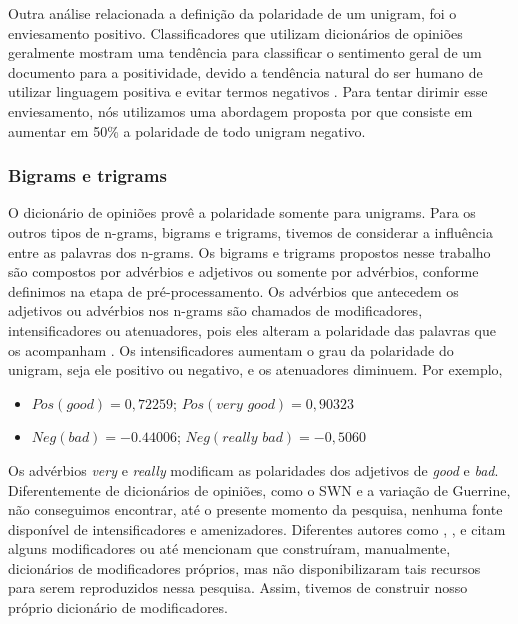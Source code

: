 Outra análise relacionada a definição da polaridade de um unigram, foi o enviesamento positivo. Classificadores que utilizam dicionários de opiniões geralmente mostram uma tendência para classificar o sentimento geral de um documento para a positividade, devido a tendência natural do ser humano de utilizar linguagem positiva e evitar termos negativos \cite{boucher1969pollyanna, kennedy2006sentiment}. Para tentar dirimir esse enviesamento, nós utilizamos uma abordagem proposta por \cite{taboada2011lexicon} que consiste em aumentar em 50\% a polaridade de todo unigram negativo. 

\subsubsection{Bigrams e trigrams}

O dicionário de opiniões provê a polaridade somente para unigrams. Para os outros tipos de n-grams, bigrams e trigrams, tivemos de considerar a influência entre as palavras dos n-grams. Os bigrams e trigrams propostos nesse trabalho são compostos por advérbios e adjetivos ou somente por advérbios, conforme definimos na etapa de pré-processamento. Os advérbios que antecedem os adjetivos ou advérbios nos n-grams são chamados de modificadores, intensificadores ou atenuadores, pois eles alteram a polaridade das palavras que os acompanham \cite{voll2007not}. Os intensificadores aumentam o grau da polaridade do unigram, seja ele positivo ou negativo, e os atenuadores diminuem. Por exemplo, 

\begin{itemize}
\item \label{itm:very_exem} $Pos(\textit{good}) = 0,72259$; $Pos(\textit{very good}) = 0,90323$
\item \label{itm:really_exem} $Neg(\textit{bad}) = -0.44006$; $Neg(\textit{really bad}) = -0,5060$
\end{itemize}

Os advérbios \textit{very} e \textit{really} modificam as polaridades dos adjetivos de \textit{good} e \textit{bad}. Diferentemente de dicionários de opiniões, como o SWN e a variação de Guerrine, não conseguimos encontrar, até o presente momento da pesquisa, nenhuma fonte disponível de intensificadores e amenizadores. Diferentes autores como \cite{voll2007not}, \cite{taboada2008extracting}, \cite{taboada2011lexicon} e \cite{pimpalkar2013sentimental} citam alguns modificadores ou até mencionam que construíram, manualmente, dicionários de modificadores próprios, mas não disponibilizaram tais recursos para serem reproduzidos nessa pesquisa. Assim, tivemos de construir nosso próprio dicionário de modificadores. 

